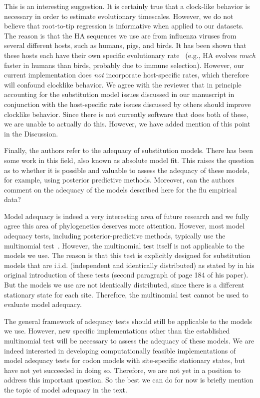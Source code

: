 \documentclass[11pt, oneside]{article}   	%
\newcommand{\response}[1]{{\color{black}#1}}
\begin{document}
\response{This is an interesting suggestion. 
It is certainly true that a clock-like behavior is necessary in order to estimate evolutionary timescales. 
However, we do not believe that root-to-tip regression is informative when applied to our datasets. 
The reason is that the HA sequences we use are from influenza viruses from several different hosts, such as humans, pigs, and birds. 
It has been shown that these hosts each have their own specific evolutionary rate~\citep{worobey2014synchronized} (e.g., HA evolves \emph{much} faster in humans than birds, probably due to immune selection).
However, our current implementation does \emph{not} incorporate host-specific rates, which therefore will confound clocklike behavior.
We agree with the reviewer that in principle accounting for the substitution model issues discussed in our manuscript in conjunction with the host-specific rate issues discussed by others should improve clocklike behavior.
Since there is not currently software that does both of these, we are unable to actually do this.
However, we have added mention of this point in the Discussion.
}

Finally, the authors refer to the adequacy of substitution models. 
There has been some work in this field, also known as absolute model fit. 
This raises the question as to whether it is possible and valuable to assess the adequacy of these models, for example, using posterior predictive methods. 
Moreover, can the authors comment on the adequacy of the models described here for the flu empirical data? 

\response{
Model adequacy is indeed a very interesting area of future research and we fully agree this area of phylogenetics deserves more attention. 
However, most model adequacy tests, including posterior-predictive methods, typically use the multinomial test~\citep{goldman1993statistical, brown2018evaluating}. 
However, the multinomial test itself is not applicable to the models we use.
The reason is that this test is explicitly designed for substitution models that are i.i.d. (independent and identically distributed) as stated by \citet{goldman1993statistical} in his original introduction of these tests (second paragraph of page 184 of his paper).
But the models we use are not identically distributed, since there is a different stationary state for each site.
Therefore, the multinomial test cannot be used to evaluate model adequacy.

The general framework of adequacy tests should still be applicable to the models we use.
However, new specific implementations other than the established multinomial test will be necessary to assess the adequacy of these models.
We are indeed interested in developing computationally feasible implementations of model adequacy tests for codon models with site-specific stationary states, but have not yet succeeded in doing so.
Therefore, we are not yet in a position to address this important question.
So the best we can do for now is briefly mention the topic of model adequacy in the text. 
}

\clearpage 
\color{black}

{\small

}
\end{document}

